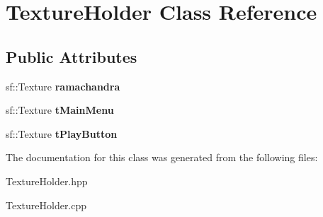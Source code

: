 \hypertarget{class_texture_holder}{\section{Texture\-Holder Class Reference}
\label{class_texture_holder}
}
\subsection*{Public Attributes}
\begin{DoxyCompactItemize}
\item 
\hypertarget{class_texture_holder_a8e5c63064c00c3b693dd78ec3b636fec}{sf\-::\-Texture {\bfseries ramachandra}}\label{class_texture_holder_a8e5c63064c00c3b693dd78ec3b636fec}

\item 
\hypertarget{class_texture_holder_aa7bf75dcef805fbd8e979ac35fd3002e}{sf\-::\-Texture {\bfseries t\-Main\-Menu}}\label{class_texture_holder_aa7bf75dcef805fbd8e979ac35fd3002e}

\item 
\hypertarget{class_texture_holder_a5c758224eb37c10e052b4a88adc7d774}{sf\-::\-Texture {\bfseries t\-Play\-Button}}\label{class_texture_holder_a5c758224eb37c10e052b4a88adc7d774}

\end{DoxyCompactItemize}


The documentation for this class was generated from the following files\-:\begin{DoxyCompactItemize}
\item 
Texture\-Holder.\-hpp\item 
Texture\-Holder.\-cpp\end{DoxyCompactItemize}
